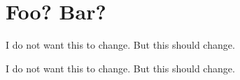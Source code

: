 \section{Foo? Bar?}

I do not want this to change.
But this
should change.

I do not want this to change.
But this
should change.
